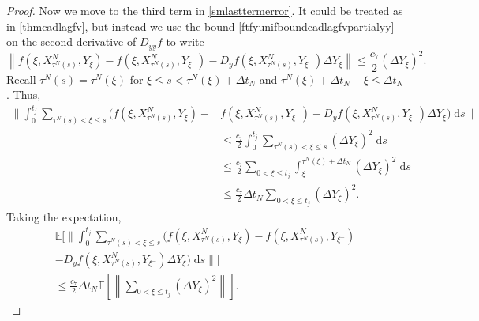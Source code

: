 \documentclass[reqno,12pt]{amsart}
\theoremstyle{plain} %
\theoremstyle{definition} %
\begin{document}
\begin{proof}
    Now we move to the third term in \eqref{smlasttermerror}. It could be treated as in \cref{thmcadlagfv}, but instead we use the bound \eqref{ftfyunifboundcadlagfvpartialyy} on the second derivative of $D_{yy}f$ to write
    \begin{equation*}
        \left\| f(\xi, X_{\tau^N(s)}^N, Y_\xi) - f(\xi, X_{\tau^N(s)}^N, Y_{\xi^{-}}) - D_y f(\xi, X_{\tau^N(s)}^N, Y_{\xi^-}) \Delta Y_\xi \right\| \leq \frac{c_7}{2}\left( \Delta Y_\xi \right)^2.
    \end{equation*}
    Recall $\tau^N(s) = \tau^N(\xi)$ for $\xi \leq s < \tau^N(\xi) + \Delta t_N$ and $\tau^N(\xi) + \Delta t_N- \xi \leq \Delta t_N$. Thus,
    \begin{align*}
        \Bigg\|\int_0^{t_j} \sum_{\tau^N(s) < \xi \leq s} \bigg(f(\xi, X_{\tau^N(s)}^N, Y_\xi) - & f(\xi, X_{\tau^N(s)}^N, Y_{\xi^{-}}) - D_y f(\xi, X_{\tau^N(s)}^N, Y_{\xi^-})\Delta Y_\xi\bigg) \;\mathrm{d}s\Bigg\| \\
        & \leq \frac{c_7}{2}\int_0^{t_j} \sum_{\tau^N(s) < \xi \leq s} \left( \Delta Y_\xi \right)^2\;\mathrm{d}s \\
        & \leq \frac{c_7}{2}\sum_{0 < \xi \leq t_j}\int_\xi^{\tau^N(\xi) + \Delta t_N} \left( \Delta Y_\xi \right)^2\;\mathrm{d}s \\
        & \leq \frac{c_7}{2} \Delta t_N  \sum_{0 < \xi \leq t_j}\left(\Delta Y_\xi \right)^2.
    \end{align*}
    Taking the expectation,
    \begin{multline*}
        \mathbb{E}\Bigg[\Bigg\|\int_0^{t_j} \sum_{\tau^N(s) < \xi \leq s} \bigg(f(\xi, X_{\tau^N(s)}^N, Y_\xi) - f(\xi, X_{\tau^N(s)}^N, Y_{\xi^{-}}) \\
        - D_y f(\xi, X_{\tau^N(s)}^N, Y_{\xi^-})\Delta Y_\xi\bigg) \;\mathrm{d}s\Bigg\|\Bigg] \\
        \leq \frac{c_7}{2} \Delta t_N \mathbb{E}\left[\left\|\sum_{0 < \xi \leq t_j}\left( \Delta Y_\xi \right)^2\right\|\right].
    \end{multline*}


\end{proof}
\end{document}
